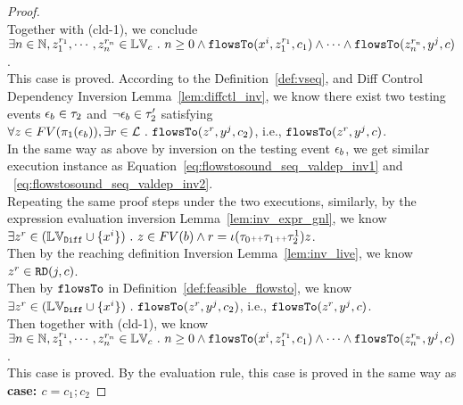 \begin{proof}
\\
Together with (cld-1), we conclude 
\\
$\exists n \in \mathbb{N}, z_1^{r_1}, \cdots, z_n^{r_n} \in \mathbb{LV}_{{c}} ~.~   n \geq 0 \land
\mathtt{flowsTo}(x^i,  z_1^{r_1}, c_1) 
\land \cdots \land \mathtt{flowsTo}(z_n^{r_n}, y^j, c)$.
\\
This case is proved.
According to the Definition~\ref{def:vseq},
and {Diff Control Dependency Inversion Lemma~\ref{lem:diffctl_inv}}, we know 
there exist two testing events $\mathtt{\epsilon}_b \in \mathtt{\tau}_2$ and $\neg\mathtt{\epsilon}_b \in \mathtt{\tau}_2'$ satisfying 
\\
$\forall z \in FV(\pi_1(\mathtt{\epsilon}_b)), \exists r \in \mathcal{L} ~.~   \mathtt{flowsTo}(z^r, y^j, c_2)$, 
i.e., $\mathtt{flowsTo}(z^r, y^j, c)$.
\\
In the same way as above by inversion on the testing event $\mathtt{\epsilon}_b$, we get similar execution instance as 
Equation~\ref{eq:flowstosound_seq_valdep_inv1} and ~\ref{eq:flowstosound_seq_valdep_inv2}.
\\
Repeating the same proof steps under the two executions,
similarly, by the expression evaluation inversion Lemma~\ref{lem:inv_expr_gnl}, we know 
\\
$\exists z^r \in (\mathbb{LV}_{\mathtt{Diff}} \cup \{x^i\} ) ~.~   z \in FV(b) 
\land r = \iota(\mathtt{\tau}_0 {\scriptscriptstyle ++} \mathtt{\tau}_1 {\scriptscriptstyle ++} \mathtt{\tau}_2^1) z$.
\\
Then by the reaching definition Inversion Lemma~\ref{lem:inv_live}, we know $z^r \in \mathtt{RD}(j, c)$.
\\
Then by $\mathtt{flowsTo}$ in Definition~\ref{def:feasible_flowsto}, 
we know 
$ \exists z^r \in (\mathbb{LV}_{\mathtt{Diff}} \cup \{x^i\} ) ~.~   \mathtt{flowsTo}(z^r, y^j, c_2)$, i.e., $\mathtt{flowsTo}(z^r, y^j, c)$.
\\
Then together with (cld-1),
we know 
\\
$\exists n \in \mathbb{N}, z_1^{r_1}, \cdots, z_n^{r_n} \in \mathbb{LV}_{{c}} ~.~   n \geq 0 \land
\mathtt{flowsTo}(x^i,  z_1^{r_1}, c_1) 
\land \cdots \land \mathtt{flowsTo}(z_n^{r_n}, y^j, c)$.
\\
This case is proved.
  By the evaluation rule, this case is proved in the same way as \textbf{case: $c = c_1; c_2$}
\end{proof}

